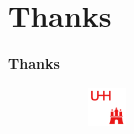 
\section{Thanks}
\begin{frame}
    
    \centering
    \vspace{2cm}
    
    \textbf{\Huge Thanks}
    
    
    
    
    \vspace{2cm}
    \begin{figure}
        \centering
        \begin{subfigure}{0.2\textwidth}
            \centering
            \includegraphics[height=1cm]{assets/logo/red.pdf}
        \end{subfigure}%
    \end{figure}
\end{frame}